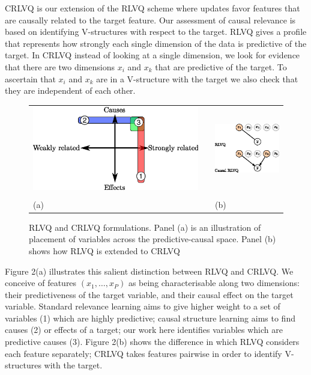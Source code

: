 \documentclass{esannV2}
\begin{document}
CRLVQ is our extension of the RLVQ scheme where updates favor features that are causally related to the target feature. Our assessment of causal relevance is based on identifying V-structures with respect to the target. RLVQ gives a profile that represents how strongly each single dimension of the data is predictive of the target. In CRLVQ instead of looking at a single dimension, we look for evidence that there are two dimensions $x_i$ and $x_k$ that are predictive of the target. To ascertain that $x_i$ and $x_k$ are in a V-structure with the target we also check that they are independent of each other.

\begin{figure}
\begin{tabular}{m{}cm{}}
\includegraphics[width=.5\textwidth]{causal-relevance-dimensions.eps} & &
\includegraphics[width=.35\textwidth]{rlvq-crlvq.eps} \\
& \\
(a) & & (b)  
\end{tabular}
\label{fig:causes}
\caption{RLVQ and CRLVQ formulations. Panel (a) is an illustration of placement of variables across the predictive-causal space. Panel (b) shows how RLVQ is extended to CRLVQ}
\end{figure}

Figure 2(a) illustrates this salient distinction between RLVQ and CRLVQ. We conceive of features $(x_1, \ldots, x_P)$ as being characterisable along two dimensions: their predictiveness of the target variable, and their causal effect on the target variable. Standard relevance learning aims to give higher weight to a set of variables (1) which are highly predictive; causal structure learning aims to find causes (2) or effects of a target; our work here identifies variables which are predictive causes (3). Figure 2(b) shows the difference in which RLVQ considers each feature separately; CRLVQ takes features pairwise in order to identify V-structures with the target.
 
\end{document}
